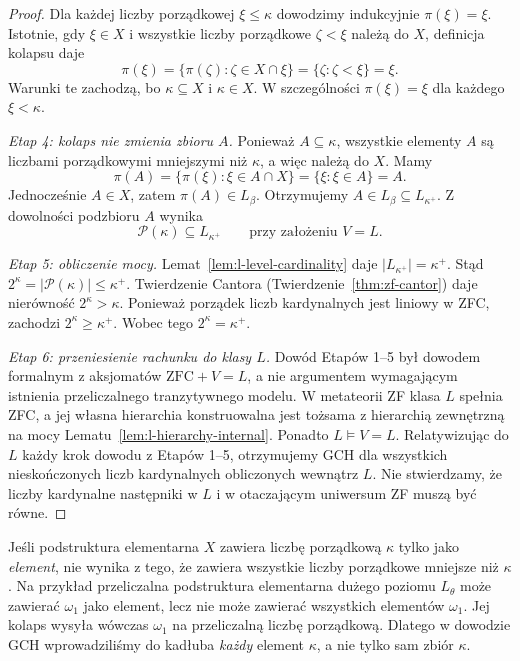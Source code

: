 \begin{proof}
Dla każdej liczby porządkowej $\xi\le\kappa$
dowodzimy indukcyjnie $\pi(\xi)=\xi$.
Istotnie, gdy $\xi\in X$ i wszystkie liczby porządkowe
$\zeta<\xi$ należą do $X$, definicja kolapsu daje
\[
 \pi(\xi)=\{\pi(\zeta):\zeta\in X\cap\xi\}
 =\{\zeta:\zeta<\xi\}=\xi.
\]
Warunki te zachodzą, bo $\kappa\subseteq X$
i $\kappa\in X$. W szczególności
$\pi(\xi)=\xi$ dla każdego $\xi<\kappa$.

\emph{Etap 4: kolaps nie zmienia zbioru $A$.}
Ponieważ $A\subseteq\kappa$, wszystkie elementy $A$
są liczbami porządkowymi mniejszymi niż $\kappa$,
a więc należą do $X$. Mamy
\[
 \pi(A)=\{\pi(\xi):\xi\in A\cap X\}
       =\{\xi:\xi\in A\}=A.
\]
Jednocześnie $A\in X$, zatem $\pi(A)\in L_\beta$.
Otrzymujemy $A\in L_\beta\subseteq L_{\kappa^+}$.
Z dowolności podzbioru $A$ wynika
\[
 \mathcal P(\kappa)\subseteq L_{\kappa^+}
 \qquad\text{przy założeniu }V=L.
\]

\emph{Etap 5: obliczenie mocy.}
Lemat~\ref{lem:l-level-cardinality} daje
$|L_{\kappa^+}|=\kappa^+$. Stąd
$2^\kappa=|\mathcal P(\kappa)|\le\kappa^+$.
Twierdzenie Cantora (Twierdzenie~\ref{thm:zf-cantor})
daje nierówność $2^\kappa>\kappa$. Ponieważ
porządek liczb kardynalnych jest liniowy w ZFC,
zachodzi $2^\kappa\ge\kappa^+$. Wobec tego
$2^\kappa=\kappa^+$.

\emph{Etap 6: przeniesienie rachunku do klasy $L$.}
Dowód Etapów 1--5 był dowodem formalnym z aksjomatów
$\mathrm{ZFC}+V=L$, a nie argumentem wymagającym
istnienia przeliczalnego tranzytywnego modelu.
W metateorii ZF klasa $L$ spełnia ZFC, a jej
własna hierarchia konstruowalna jest tożsama
z hierarchią zewnętrzną na mocy
Lematu~\ref{lem:l-hierarchy-internal}.
Ponadto $L\models V=L$. Relatywizując do $L$
każdy krok dowodu z Etapów 1--5, otrzymujemy
GCH dla wszystkich nieskończonych liczb
kardynalnych obliczonych wewnątrz $L$.
Nie stwierdzamy, że liczby kardynalne następniki
w $L$ i w otaczającym uniwersum ZF muszą być równe.
\end{proof}

\begin{przyklad}
\label{ex:l-hull-kappa-subset}
Jeśli podstruktura elementarna $X$ zawiera liczbę
porządkową $\kappa$ tylko jako \emph{element}, nie wynika
z tego, że zawiera wszystkie liczby porządkowe
mniejsze niż $\kappa$. Na przykład przeliczalna
podstruktura elementarna dużego poziomu $L_\theta$
może zawierać $\omega_1$ jako element, lecz nie może
zawierać wszystkich elementów $\omega_1$.
Jej kolaps wysyła wówczas $\omega_1$ na przeliczalną
liczbę porządkową. Dlatego w dowodzie GCH
wprowadziliśmy do kadłuba \emph{każdy} element $\kappa$,
a nie tylko sam zbiór $\kappa$.
\end{przyklad}

